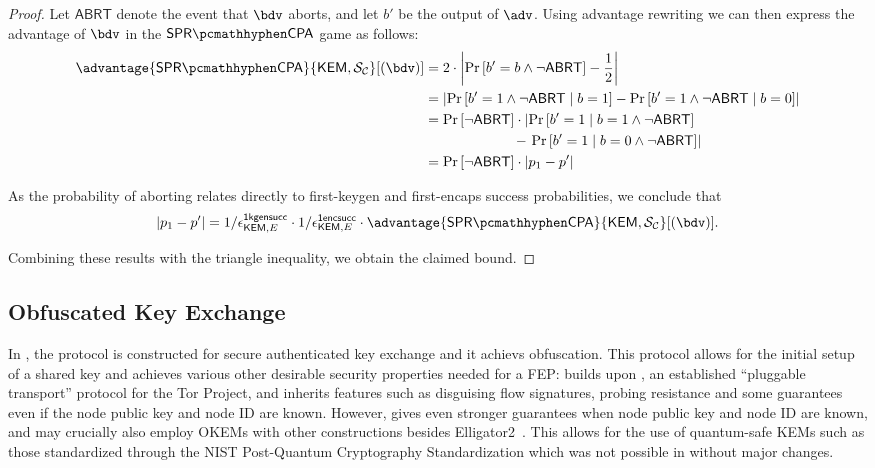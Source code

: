 \begin{proof}
    Let $\mathsf{ABRT}$ denote the event that $\bdv$ aborts, and let $b'$ be the output of $\adv$. Using advantage rewriting we can then express the advantage of $\bdv$ in the $\sprcpa$ game as follows:
    \begin{align*}
        \advantage{\sprcpa}{\KEM, \simulunif}[(\bdv)]
        &=
        2 \cdot \left|
            \Pr\left[b'=b \land \neg \mathsf{ABRT} \right] - \frac{1}{2}
        \right| \\
        &=
        \left|
            \Pr\left[b'=1 \land \neg \mathsf{ABRT} \mid b=1 \right] - \Pr\left[b'=1 \land \neg \mathsf{ABRT} \mid b=0 \right]
        \right| \\
        &=
        \Pr\left[\neg \mathsf{ABRT}\right] \cdot
        \left|
            \Pr\left[b'=1 \mid b=1 \land \neg \mathsf{ABRT} \right]
        \right.\\   
        &\qquad\qquad\qquad\  - \left.
            \Pr\left[b'=1 \mid b=0 \land \neg \mathsf{ABRT} \right]
        \right| \\
        &=
        \Pr\left[\neg \mathsf{ABRT}\right] \cdot
        \left|
            p_1 - p'
        \right|
    \end{align*}

    As the probability of aborting relates directly to first-keygen and first-encaps success probabilities, we conclude that
    \[
    \left| p_1 - p' \right| =
    1/\epsilon^\firstkeygensuccess_{\KEM,E}
    \cdot 1/\epsilon^\firstencapssuccess_{\KEM,E}
    \cdot \advantage{\sprcpa}{\KEM, \simulunif}[(\bdv)].
    \]
    
    Combining these results with the triangle inequality, we obtain the claimed bound.
\end{proof}

\subsection{Obfuscated Key Exchange}

In \cite{CCS:GunSteVei24}, the \pqobfs{} protocol is constructed for secure authenticated key exchange and it achievs obfuscation. This protocol allows for the initial setup of a shared key and achieves various other desirable security properties needed for a FEP:
\pqobfs{} builds upon \obfsfour{} \cite{obfs4}, an established ``pluggable transport'' protocol for the Tor Project, and \pqobfs{} inherits features such as disguising flow signatures, probing resistance and some guarantees even if the node public key and node ID are known.
However, \pqobfs{} gives even stronger guarantees when node public key and node ID are known, and may crucially also employ OKEMs with other constructions besides \textsf{Elligator2}~\cite{CCS:BHKL13}. This allows for the use of quantum-safe KEMs such as those standardized through the NIST Post-Quantum Cryptography Standardization \cite{nist-standardization} which was not possible in \obfsfour{} without major changes.

